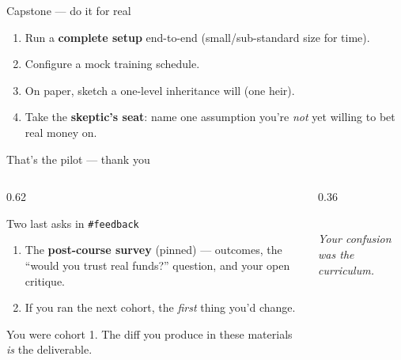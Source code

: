\documentclass[aspectratio=169,11pt]{beamer}
\begin{document}
\begin{frame}{Capstone --- do it for real}
  \begin{tryit}[In session]
    \begin{enumerate}\small
      \item Run a \textbf{complete setup} end-to-end (small/sub-standard size for
        time).
      \item Configure a mock training schedule.
      \item On paper, sketch a one-level inheritance will (one heir).
      \item Take the \textbf{skeptic's seat}: name one assumption you're
        \emph{not} yet willing to bet real money on.
    \end{enumerate}
  \end{tryit}
\end{frame}

\begin{frame}{That's the pilot --- thank you}
  \begin{columns}[T]
    \begin{column}{0.62\textwidth}
      \begin{block}{Two last asks in \texttt{\#feedback}}
        \begin{enumerate}\small
          \item The \textbf{post-course survey} (pinned) --- outcomes, the
            ``would you trust real funds?'' question, and your open critique.
          \item If you ran the next cohort, the \emph{first} thing you'd change.
        \end{enumerate}
      \end{block}
      \footnotesize You were cohort 1. The diff you produce in these materials
      \emph{is} the deliverable.
    \end{column}
    \begin{column}{0.36\textwidth}
      \begin{center}\gwflagicon\\[3pt]
      {\footnotesize\color{attackcol}\itshape Your confusion was the curriculum.}
      \end{center}
    \end{column}
  \end{columns}
\end{frame}

\end{document}
